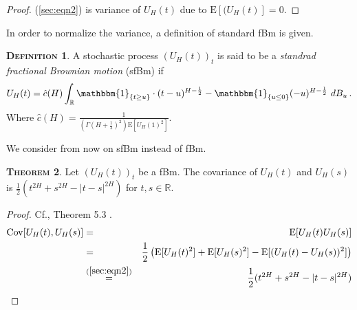 \documentclass[a4paper, twoside, 11pt]{article}
\theoremstyle{definition}
\newtheorem{definition}{\scshape Definition}[section]
\newtheorem{theorem}[definition]{\scshape Theorem}
\newcommand{\brkt}[1]{\left({#1} \right)}
\begin{document}
\begin{proof}
  (\ref{sec:eqn2}) is variance of $U_H(t)$ due to $\mathrm{E}[(U_H(t)] = 0$.
\end{proof}
In order to normalize the variance, a definition of standard fBm is given.

\begin{definition}
  A stochastic process $(U_H(t))_{t}$ is said to be a \emph{standrad fractional Brownian motion} (sfBm) if
  \begin{equation}
U_H(t) = \hat{c}(H) \int_{\mathbb{R}} \mathbbm{1}_{\{t\ge u\}}\cdot (t-u)^{H-\frac{1}{2}} - \mathbbm{1}_{\{u\le 0\}} (-u)^{H-\frac{1}{2}} \, \mathop{dB_u}.
\label{sec:eqn3}
\end{equation}
Where $\hat{c}(H) = \frac{1}{(\Gamma(H+\frac{1}{2})^2)\mathrm{E}[U_H(1)^2]} $.
\end{definition}
We consider from now on sfBm instead of fBm.

\begin{theorem}
  Let  $(U_H(t))_{t}$ be a fBm. The covariance of $U_H(t)$ and $U_H(s)$ is $ \frac{1}{2}(t^{2H} + s^{2H} - |t-s|^{2H})$ for $t, s \in \mathbb{R}$.
\end{theorem}

\begin{proof}
  Cf.\cite{mandelbrot}, Theorem 5.3 .
  \begin{eqnarray}
	\mathrm{Cov}[U_H(t), U_H(s)] &=& \mathrm{E}[U_H(t)U_H(s)] \nonumber\\
	&=& \frac{1}{2}\brkt{\mathrm{E}[U_H(t)^2] + \mathrm{E}[U_H(s)^2] - \mathrm{E}[(U_H(t) - U_H(s))^2]} \nonumber\\
	&\overset{(\ref{sec:eqn2})}{=}& \frac{1}{2}(t^{2H} + s^{2H} - |t-s|^{2H})
	\label{sec:eqn4}
  \end{eqnarray}
\end{proof}
\end{document}
